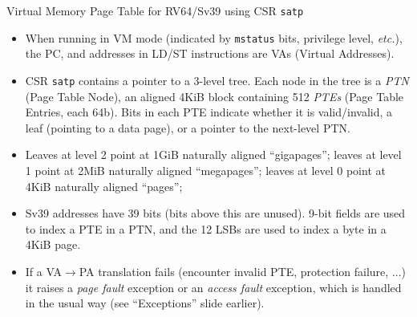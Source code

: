 \documentclass{article}
\newcommand{\etc}{\emph{etc.}}
\begin{document}
\clearpage


\begin{center}
  {\Huge
    Virtual Memory Page Table for RV64/Sv39 using CSR {\tt satp}}

  \vspace*{0.1in}


  \vspace*{0.2in}

  \begin{minipage}[t]{11in}\large
    \begin{itemize}

    \item When running in VM mode (indicated by {\tt mstatus} bits,
      privilege level, {\etc}), the PC, and addresses in LD/ST
      instructions are VAs (Virtual Addresses).

    \item CSR {\tt satp} contains a pointer to a 3-level tree.  Each
      node in the tree is a \emph{PTN} (Page Table Node), an aligned
      4KiB block containing 512 \emph{PTEs} (Page Table Entries, each
      64b).  Bits in each PTE indicate whether it is valid/invalid, a
      leaf (pointing to a data page), or a pointer to the next-level
      PTN.

    \item Leaves at level 2 point at 1GiB naturally aligned ``gigapages'';
      leaves at level 1 point at 2MiB naturally aligned ``megapages'';
      leaves at level 0 point at 4KiB naturally aligned ``pages'';

    \item Sv39 addresses have 39 bits (bits above this are
      unused). 9-bit fields are used to index a PTE in a PTN, and the
      12 LSBs are used to index a byte in a 4KiB page.

      \item If a VA$\rightarrow$PA translation fails (encounter
        invalid PTE, protection failure, ...) it raises a \emph{page
        fault} exception or an \emph{access fault} exception, which is
        handled in the usual way (see ``Exceptions'' slide earlier).
    \end{itemize}
  \end{minipage}
\end{center}
\end{document}
